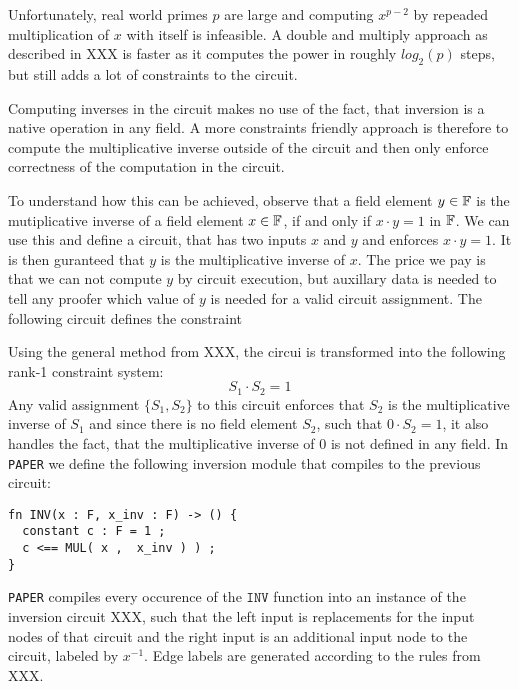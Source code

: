 Unfortunately, real world primes $p$ are large and computing $x^{p-2}$ by repeaded multiplication of $x$ with itself is infeasible. A double and multiply approach as described in XXX is faster as it computes the power in roughly $log_2(p)$ steps, but still adds a lot of constraints to the circuit. 

Computing inverses in the circuit makes no use of the fact, that inversion is a native operation in any field. A more constraints friendly approach is therefore to compute the multiplicative inverse outside of the circuit and then only enforce correctness of the computation in the circuit. 

To understand how this can be achieved, observe that a field element $y\in \mathbb{F}$ is the mutiplicative inverse of a field element $x\in \mathbb{F}$, if and only if $x\cdot y =1$ in $\mathbb{F}$. We can use this and define a circuit, that has two inputs $x$ and $y$ and enforces $x\cdot y =1$. It is then guranteed that $y$ is the multiplicative inverse of $x$. The price we pay is that we can not compute $y$ by circuit execution, but auxillary data is needed to tell any proofer which value of $y$ is needed for a valid circuit assignment.  The following circuit defines the constraint
\begin{center}
\end{center}
Using the general method from XXX, the circui is transformed into the following rank-1 constraint system:
\begin{equation}
S_1 \cdot S_2 = 1
\end{equation}
Any valid assignment $\{S_1,S_2\}$ to this circuit enforces that $S_2$ is the multiplicative inverse of $S_1$ and since there is no field element $S_2$, such that $0\cdot S_2=1$, it also handles the fact, that the multiplicative inverse of $0$ is not defined in any field. In \texttt{PAPER} we define the following inversion module that compiles to the previous circuit:
\begin{lstlisting}
fn INV(x : F, x_inv : F) -> () {
  constant c : F = 1 ;
  c <== MUL( x ,  x_inv ) ) ;
}
\end{lstlisting}
\texttt{PAPER} compiles every occurence of the $\mathtt{INV}$ function into an instance of the inversion circuit XXX, such that the left input is replacements for the input nodes of that circuit and the right input is an additional input node to the circuit, labeled by $x^{-1}$. Edge labels are generated according to the rules from XXX.
